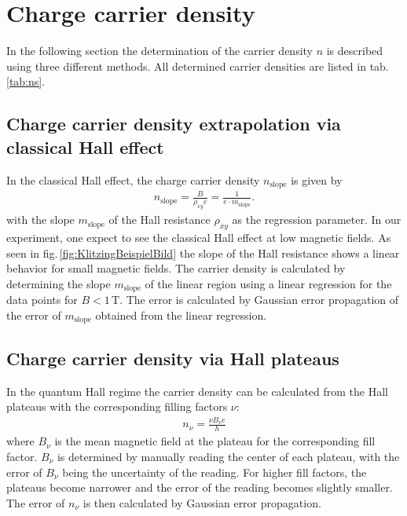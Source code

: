 \section{Charge carrier density}
In the following section the determination of the carrier density $n$ is described using three different methods.
All determined carrier densities are listed in tab.\,\ref{tab:ns}.
\subsection{Charge carrier density extrapolation via classical Hall effect}
In the classical Hall effect, the charge carrier density $n_\text{slope}$ is given by 
\begin{align}
    n_\text{slope} = \frac{B}{\rho_{xy}e} = \frac{1}{e \cdot m_\text{slope}}.
    \label{eq:chargeCarrierClassicalHall}
\end{align}
with the slope $m_\text{slope}$ of the Hall resistance $\rho_{xy}$ as the regression parameter.
In our experiment, one expect to see the classical Hall effect at low magnetic fields.
As seen in fig.\,\ref{fig:KlitzingBeispielBild} the slope of the Hall resistance shows a linear behavior for small magnetic fields.
The carrier density is calculated by determining the slope $m_\text{slope}$ of the linear region using a linear regression for the data points for $B<1\,\text{T}$.
The error is calculated by Gaussian error propagation of the error of $m_\text{slope}$ obtained from the linear regression.

\subsection{Charge carrier density via Hall plateaus}
In the quantum Hall regime the carrier density can be calculated from the Hall plateaus with the corresponding filling factors $\nu$:
\begin{align} 
    n_\nu = \frac{\nu B_\nu e}{h} \label{eq:nnu} 
\end{align} 
where $B_\nu$ is the mean magnetic field at the plateau for the corresponding fill factor.
$B_\nu$ is determined by manually reading the center of each plateau, with the error of $B_\nu$ being the uncertainty of the reading. For higher fill factors, the plateaus become narrower and the error of the reading becomes slightly smaller.
The error of $n_\nu$ is then calculated by Gaussian error propagation.

